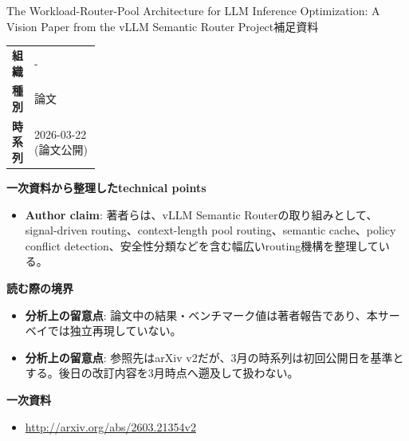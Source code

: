 \begin{technicalnote}{The Workload-Router-Pool Architecture for LLM Inference Optimization: A Vision Paper from the vLLM Semantic Router Project}{補足資料}
\begingroup
\begin{tabularx}{\linewidth}{@{}>{\bfseries}p{0.22\linewidth}X@{}}
組織 & - \\
種別 & 論文 \\
時系列 & 2026-03-22 (論文公開) \\
\end{tabularx}
\smallskip
{\bfseries 一次資料から整理したtechnical points}
\begin{itemize}[leftmargin=1.5em,itemsep=0.35em]
\item \textbf{Author claim}: 著者らは、vLLM Semantic Routerの取り組みとして、signal-driven routing、context-length pool routing、semantic cache、policy conflict detection、安全性分類などを含む幅広いrouting機構を整理している。
\end{itemize}
\begin{minipage}{\linewidth}
{\bfseries 読む際の境界}
\begin{itemize}[leftmargin=1.5em,itemsep=0.35em]
\item \textbf{分析上の留意点}: 論文中の結果・ベンチマーク値は著者報告であり、本サーベイでは独立再現していない。
\item \textbf{分析上の留意点}: 参照先はarXiv v2だが、3月の時系列は初回公開日を基準とする。後日の改訂内容を3月時点へ遡及して扱わない。
\end{itemize}
\begin{samepage}
{\bfseries 一次資料}
\begingroup\sloppy
\begin{itemize}[leftmargin=1.5em,itemsep=0.25em]
\item {\scriptsize\url{http://arxiv.org/abs/2603.21354v2}}
\end{itemize}
\endgroup
\end{samepage}
\end{minipage}
\endgroup
\end{technicalnote}
\medskip

